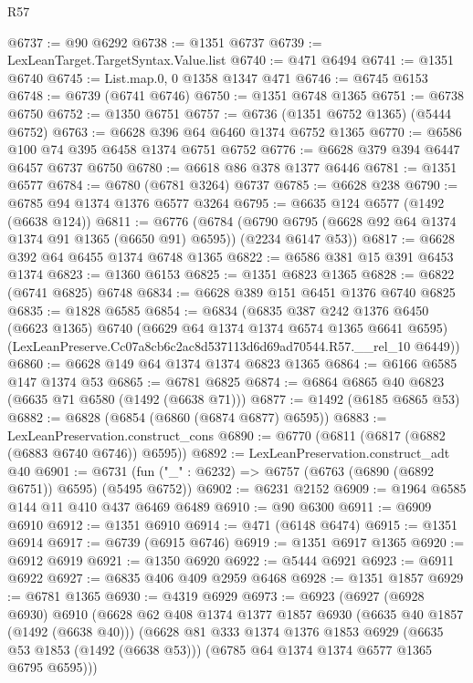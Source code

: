 \begin{lexlean}{R57}
\begin{coremodule}
@6737 := @90 @6292
@6738 := @1351 @6737
@6739 := LexLeanTarget.TargetSyntax.Value.list
@6740 := @471 @6494
@6741 := @1351 @6740
@6745 := List.map.{0, 0} @1358 @1347 @471
@6746 := @6745 @6153
@6748 := @6739 (@6741 @6746)
@6750 := @1351 @6748 @1365
@6751 := @6738 @6750
@6752 := @1350 @6751
@6757 := @6736 (@1351 @6752 @1365) (@5444 @6752)
@6763 := @6628 @396 @64 @6460 @1374 @6752 @1365
@6770 := @6586 @100 @74 @395 @6458 @1374 @6751 @6752
@6776 := @6628 @379 @394 @6447 @6457 @6737 @6750
@6780 := @6618 @86 @378 @1377 @6446
@6781 := @1351 @6577
@6784 := @6780 (@6781 @3264) @6737
@6785 := @6628 @238
@6790 := @6785 @94 @1374 @1376 @6577 @3264
@6795 := @6635 @124 @6577 (@1492 (@6638 @124))
@6811 := @6776
    (@6784 (@6790 @6795 (@6628 @92 @64 @1374 @1374 @91 @1365 (@6650 @91) @6595)) (@2234 @6147 @53))
@6817 := @6628 @392 @64 @6455 @1374 @6748 @1365
@6822 := @6586 @381 @15 @391 @6453 @1374
@6823 := @1360 @6153
@6825 := @1351 @6823 @1365
@6828 := @6822 (@6741 @6825) @6748
@6834 := @6628 @389 @151 @6451 @1376 @6740 @6825
@6835 := @1828 @6585
@6854 := @6834
    (@6835
      @387
      @242
      @1376
      @6450
      (@6623 @1365)
      @6740
      (@6629 @64 @1374 @1374 @6574 @1365 @6641 @6595)
      (LexLeanPreserve.Cc07a8cb6c2ac8d537113d6d69ad70544.R57.__rel_10 @6449))
@6860 := @6628 @149 @64 @1374 @1374 @6823 @1365
@6864 := @6166 @6585 @147 @1374 @53
@6865 := @6781 @6825
@6874 := @6864 @6865 @40 @6823 (@6635 @71 @6580 (@1492 (@6638 @71)))
@6877 := @1492 (@6185 @6865 @53)
@6882 := @6828 (@6854 (@6860 (@6874 @6877) @6595))
@6883 := LexLeanPreservation.construct_cons
@6890 := @6770 (@6811 (@6817 (@6882 (@6883 @6740 @6746)) @6595))
@6892 := LexLeanPreservation.construct_adt @40
@6901 := @6731 (fun ("_" : @6232) => @6757 (@6763 (@6890 (@6892 @6751)) @6595) (@5495 @6752))
@6902 := @6231 @2152
@6909 := @1964 @6585 @144 @11 @410 @437 @6469 @6489
@6910 := @90 @6300
@6911 := @6909 @6910
@6912 := @1351 @6910
@6914 := @471 (@6148 @6474)
@6915 := @1351 @6914
@6917 := @6739 (@6915 @6746)
@6919 := @1351 @6917 @1365
@6920 := @6912 @6919
@6921 := @1350 @6920
@6922 := @5444 @6921
@6923 := @6911 @6922
@6927 := @6835 @406 @409 @2959 @6468
@6928 := @1351 @1857
@6929 := @6781 @1365
@6930 := @4319 @6929
@6973 := @6923
    (@6927
      (@6928 @6930)
      @6910
      (@6628
        @62
        @408
        @1374
        @1377
        @1857
        @6930
        (@6635 @40 @1857 (@1492 (@6638 @40)))
        (@6628
          @81
          @333
          @1374
          @1376
          @1853
          @6929
          (@6635 @53 @1853 (@1492 (@6638 @53)))
          (@6785 @64 @1374 @1374 @6577 @1365 @6795 @6595)))

\end{coremodule}
\end{lexlean}
